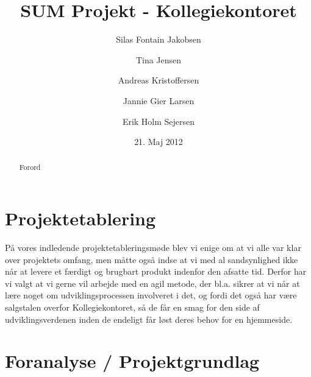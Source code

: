 \documentclass[12pt, a4paper]{report}
\title{SUM Projekt - Kollegiekontoret}
\author{Silas Fontain Jakobsen \and Tina Jensen \and Andreas Kristoffersen \and Jannie Gier Larsen \and Erik Holm Sejersen}
\date{21. Maj 2012}
\begin{document}
\begin{titlepage}
\maketitle
\end{titlepage}

\begin{abstract}
Forord
\end{abstract}

\tableofcontents

\section*{Projektetablering}
På vores indledende projektetableringsmøde blev vi enige om at vi alle var klar over projektets omfang, men måtte også indse at vi med al sandsynlighed ikke når at levere et færdigt og brugbart produkt indenfor den afsatte tid.
Derfor har vi valgt at vi gerne vil arbejde med en agil metode, der bl.a. sikrer at vi når at lære noget om udviklingsprocessen involveret i det, og fordi det også har være salgstalen overfor Kollegiekontoret, så de får en smag for den side af udviklingsverdenen inden de endeligt får løst deres behov for en hjemmeside.



\section*{Foranalyse / Projektgrundlag}
\end{document}
